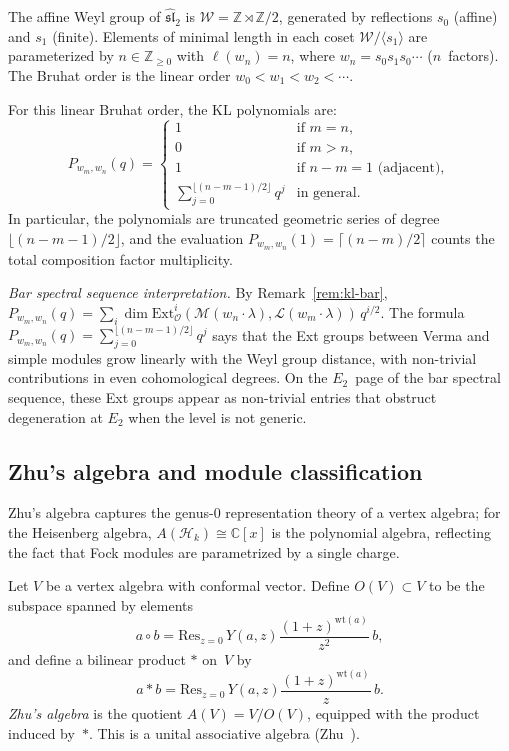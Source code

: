 \begin{example}
\label{ex:kl-sl2}
The affine Weyl group of $\widehat{\mathfrak{sl}}_2$ is
$\mathcal{W} = \mathbb{Z} \rtimes \mathbb{Z}/2$, generated by
reflections $s_0$ (affine) and $s_1$ (finite).  Elements of minimal
length in each coset $\mathcal{W}/\langle s_1 \rangle$ are
parameterized by $n \in \mathbb{Z}_{\geq 0}$ with $\ell(w_n) = n$,
where $w_n = s_0 s_1 s_0 \cdots$ ($n$~factors).  The Bruhat order is
the linear order $w_0 < w_1 < w_2 < \cdots$.

For this linear Bruhat order, the KL polynomials are:
\[
P_{w_m, w_n}(q) = \begin{cases}
1 & \text{if } m = n, \\
0 & \text{if } m > n, \\
1 & \text{if } n - m = 1 \text{ (adjacent)}, \\
\displaystyle\sum_{j=0}^{\lfloor(n-m-1)/2\rfloor} q^j
& \text{in general.}
\end{cases}
\]
In particular, the polynomials are truncated geometric series of
degree $\lfloor(n-m-1)/2\rfloor$, and the evaluation
$P_{w_m, w_n}(1) = \lceil(n-m)/2\rceil$ counts the total
composition factor multiplicity.

\emph{Bar spectral sequence interpretation.}
By Remark~\ref{rem:kl-bar}, $P_{w_m, w_n}(q) = \sum_i \dim
\mathrm{Ext}^i_{\mathcal{O}}(\mathcal{M}(w_n \cdot \lambda),
\mathcal{L}(w_m \cdot \lambda))\, q^{i/2}$.  The formula
$P_{w_m, w_n}(q) = \sum_{j=0}^{\lfloor(n-m-1)/2\rfloor} q^j$ says
that the Ext groups between Verma and simple modules grow linearly
with the Weyl group distance, with non-trivial contributions in even
cohomological degrees.  On the $E_2$~page of the bar spectral
sequence, these Ext groups appear as non-trivial entries that
obstruct degeneration at $E_2$ when the level is not generic.
\end{example}

\subsection{Zhu's algebra and module classification}

\begin{definition}\label{def:zhu-algebra}
Zhu's algebra captures the genus-$0$ representation theory of a vertex algebra; for the Heisenberg algebra, $A(\mathcal{H}_k) \cong \mathbb{C}[x]$ is the polynomial algebra, reflecting the fact that Fock modules are parametrized by a single charge.

Let $V$ be a vertex algebra with conformal vector.
Define $O(V) \subset V$ to be the subspace spanned by elements
\[
a \circ b = \mathrm{Res}_{z=0}\, Y(a,z) \frac{(1+z)^{\mathrm{wt}(a)}}{z^2}\, b,
\]
and define a bilinear product $*$ on~$V$ by
\[
a * b = \mathrm{Res}_{z=0}\, Y(a,z) \frac{(1+z)^{\mathrm{wt}(a)}}{z}\, b.
\]
\emph{Zhu's algebra} is the quotient
$A(V) = V / O(V)$,
equipped with the product induced by~$*$.  This is a
unital associative algebra (Zhu~\cite{Zhu}).
\end{definition}

